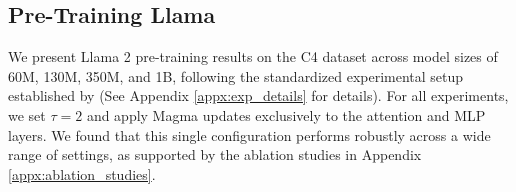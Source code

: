 \documentclass[11pt, a4paper, twocolumn, copyright, goog]{google}
\theoremstyle{plain}
\theoremstyle{definition}
\theoremstyle{remark}
\begin{document}
\begin{table}[t]
\caption{Llama 2 pre-training results on the C4 dataset. 
Validation perplexity is reported for four model scales (60M to 1B). $\dagger$ denotes results from \citet{li-etal-2025-taming}; remaining results are ours. RMSProp diverges for the 1B model within the learning rate search space.}
\centering
{}
\label{table:benchmark_c4}
\end{table}



\subsection{Pre-Training Llama}  \label{subsec:pre-training-llms}

We present Llama 2 pre-training results on the C4 dataset \citep{raffel2020exploring} across model sizes of 60M, 130M, 350M, and 1B, following the standardized experimental setup established by \citet{zhao2024galore} (See Appendix \ref{appx:exp_details} for details). For all experiments, we set $\tau = 2$ and apply Magma updates exclusively to the attention and MLP layers. We found that this single configuration performs robustly across a wide range of settings, as supported by the ablation studies in Appendix \ref{appx:ablation_studies}.
\end{document}
